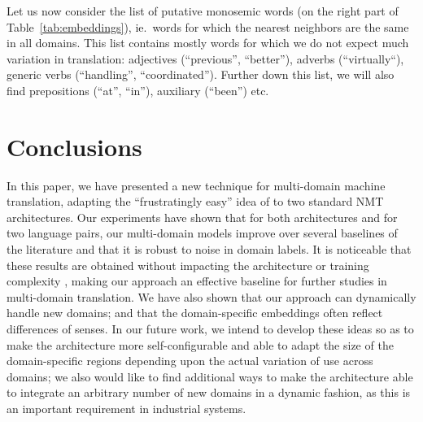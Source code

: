 Let us now consider the list of putative monosemic words (on the right part of Table~\ref{tab:embeddings}), ie.\ words for which the nearest neighbors are the same in all domains. This list contains mostly words for which we do not expect much variation in translation: adjectives (``previous'', ``better''), adverbs (``virtually``), generic verbs (``handling'', ``coordinated''). Further down this list, we will also find prepositions (``at'', ``in''), auxiliary (``been'') etc.  

\section{Conclusions}
In this paper, we have presented a new technique for multi-domain machine translation,  adapting the ``frustratingly easy'' idea of \cite{Daume07frustratingly} to two standard NMT architectures. 
Our experiments have shown that for both architectures and for two language pairs, our multi-domain models improve over several baselines of the literature and that it is robust to noise in domain labels. 
It is noticeable that these results are obtained without impacting the architecture or training complexity
, making our approach an effective baseline for further studies in multi-domain translation.
We have also shown that our approach can dynamically handle new domains; and that the domain-specific embeddings often reflect differences of senses. In our future work, we intend to develop these ideas so as to make the architecture more self-configurable and able to adapt the size of the domain-specific regions depending upon the actual variation of use across domains; we also would like to find additional ways to make the architecture able to integrate an arbitrary number of new domains in a dynamic fashion, as this is an important requirement in industrial systems.
